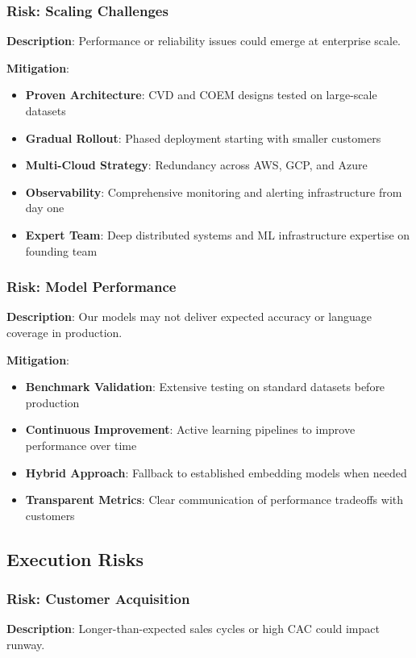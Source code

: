 \subsubsection{Risk: Scaling Challenges}
\textbf{Description}: Performance or reliability issues could emerge at enterprise scale.

\textbf{Mitigation}:
\begin{itemize}
    \item \textbf{Proven Architecture}: CVD and COEM designs tested on large-scale datasets
    \item \textbf{Gradual Rollout}: Phased deployment starting with smaller customers
    \item \textbf{Multi-Cloud Strategy}: Redundancy across AWS, GCP, and Azure
    \item \textbf{Observability}: Comprehensive monitoring and alerting infrastructure from day one
    \item \textbf{Expert Team}: Deep distributed systems and ML infrastructure expertise on founding team
\end{itemize}

\subsubsection{Risk: Model Performance}
\textbf{Description}: Our models may not deliver expected accuracy or language coverage in production.

\textbf{Mitigation}:
\begin{itemize}
    \item \textbf{Benchmark Validation}: Extensive testing on standard datasets before production
    \item \textbf{Continuous Improvement}: Active learning pipelines to improve performance over time
    \item \textbf{Hybrid Approach}: Fallback to established embedding models when needed
    \item \textbf{Transparent Metrics}: Clear communication of performance tradeoffs with customers
\end{itemize}

\subsection{Execution Risks}

\subsubsection{Risk: Customer Acquisition}
\textbf{Description}: Longer-than-expected sales cycles or high CAC could impact runway.

